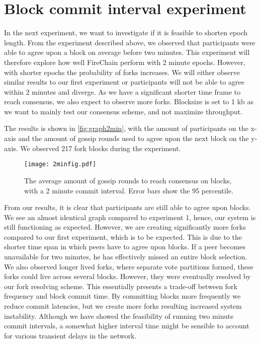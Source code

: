 \documentclass[USenglish]{uit-thesis}
\begin{document}
\section{Block commit interval experiment}
In the next experiment, we want to investigate if it is feasible to shorten epoch length.
From the experiment described above, we observed that participants were able to agree upon a block on average before two minutes. 
This experiment will therefore explore how well FireChain perform with 2 minute epochs.
However, with shorter epochs the probability of forks increases.
We will either observe similar results to our first experiment or participants will not be able to agree within 2 minutes and diverge.
As we have a significant shorter time frame to reach consensus, we also expect to observe more forks.
Blocksize is set to 1 \gls{kb} as we want to mainly test our consensus scheme, and not maximize throughput.


The results is shown in \autoref{fig:graph2min}, with the amount of participants on the x-axis and the amount of gossip rounds used to agree upon the next block on the y-axis.
We observed 217 fork blocks during the experiment.
\begin{figure}[h]
	\centering
	\texttt{[image: 2minfig.pdf]}
	\caption{The average amount of gossip rounds to reach consensus on blocks, with a 2 minute commit interval. Error bars show the 95 percentile. }
	\label{fig:graph2min}
\end{figure}

From our results, it is clear that participants are still able to agree upon blocks.
We see an almost identical graph compared to experiment 1, hence, our system is still functioning as expected.
However, we are creating significantly more forks compared to our first experiment, which is to be expected.
This is due to the shorter time span in which peers have to agree upon blocks.
If a peer becomes unavailable for two minutes, he has effectively missed an entire block selection. 
We also observed longer lived forks, where separate vote partitions formed, these forks could live across several blocks.
However, they were eventually resolved by our fork resolving scheme.
This essentially presents a trade-off between fork frequency and block commit time.
By committing blocks more frequently we reduce commit latencies, but we create more forks resulting increased system instability.
Although we have showed the feasibility of running two minute commit intervals, a somewhat higher interval time might be sensible to account for various transient delays in the network.
\end{document}
